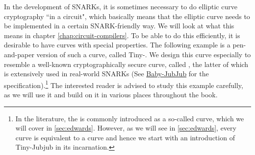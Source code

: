 In the development of SNARKs, it is sometimes necessary to do elliptic curve cryptography ``in a circuit", which basically means that the elliptic curve needs to be implemented in a certain SNARK-friendly way. We will look at what this means in chapter \ref{chap:circuit-compilers}. To be able to do this efficiently, it is desirable to have curves with special properties. The following example is a pen-and-paper version of such a curve, called Tiny-. We design this curve especially to resemble a well-known cryptographically secure curve, called , the latter of which is extensively used in real-world SNARKs (See \href{https://github.com/iden3/iden3-docs/blob/master/source/iden3_repos/research/publications/zkproof-standards-workshop-2/baby-jubjub/baby-jubjub.rst}{Baby-JubJub} for the specification).\footnote{In the literature, the  is commonly introduced as a so-called  curve, which we will cover in \ref{sec:edwards}. However, as we will see in \ref{sec:edwards}, every  curve is equivalent to a  curve and hence we start with an introduction of Tiny-Jubjub in its  incarnation.} 
The interested reader is advised to study this example carefully, as we will use it and build on it in various places throughout the book. 

